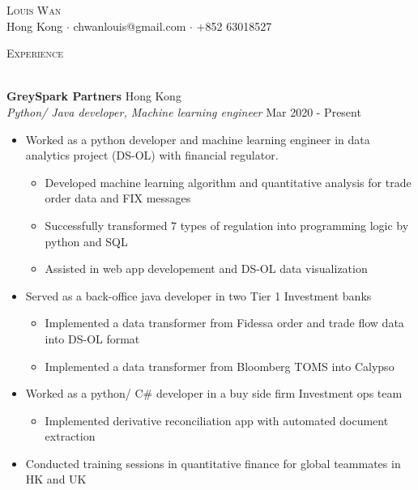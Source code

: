 \documentclass[a4paper]{article}
\newcommand{\lineunder} {
    \vspace*{-8pt} \\
    \hspace*{-18pt} \hrulefill \\
}
\newcommand{\header} [1] {
    {\hspace*{-18pt}\vspace*{6pt} \textsc{#1}}
    \vspace*{-6pt} \lineunder
}
\begin{document}
\vspace*{-40pt}

    

\vspace*{-10pt}
\begin{center}
    {\Huge \scshape {Louis Wan}}\\
    Hong Kong $\cdot$ chwanlouis@gmail.com $\cdot$ +852 63018527\\
\end{center}

\header{Experience}
\vspace{1mm}

\textbf{GreySpark Partners} \hfill Hong Kong\\
\textit{Python/ Java developer, Machine learning engineer} \hfill Mar 2020 - Present\\
\vspace{-1mm}
\begin{itemize} \itemsep 1pt
    \item Worked as a python developer and machine learning engineer in data analytics project (DS-OL) with financial regulator.
        \begin{itemize}
            \item Developed machine learning algorithm and quantitative analysis for trade order data and FIX messages
            \item Successfully transformed 7 types of regulation into programming logic by python and SQL
            \item Assisted in web app developement and DS-OL data visualization
        \end{itemize}
    \item Served as a back-office java developer in two Tier 1 Investment banks
        \begin{itemize}
            \item Implemented a data transformer from Fidessa order and trade flow data into DS-OL format
            \item Implemented a data transformer from Bloomberg TOMS into Calypso
        \end{itemize}
    \item Worked as a python/ C\# developer in a buy side firm Investment ops team
        \begin{itemize}
            \item Implemented derivative reconciliation app with automated document extraction
        \end{itemize}
    \item Conducted training sessions in quantitative finance for global teammates in HK and UK
\end{itemize}
\end{document}
